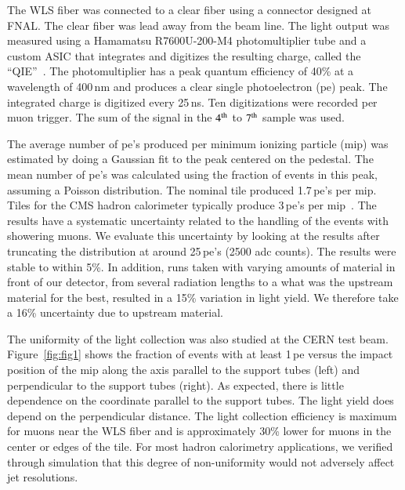 \documentclass[review]{elsarticle}
\begin{document}
The WLS fiber was connected to a clear fiber using a
connector designed at FNAL. The clear fiber was lead away from the
beam line. The light output was measured using a Hamamatsu
R7600U-200-M4 photomultiplier tube and a custom ASIC that integrates
and digitizes the resulting charge, called the ``QIE''~\cite{qie}.
The photomultiplier has a peak quantum efficiency of 40\% at a
wavelength of 400\,nm and produces a clear single photoelectron (pe)
peak. The integrated charge is digitized every 25\,ns. Ten
digitizations were recorded per muon trigger. The sum of the signal
in the ${\rm 4^{th}}$ to ${\rm 7^{th}}$ sample was used.

The average number of pe's produced per minimum ionizing particle
(mip) was estimated by doing a Gaussian fit to the peak centered on
the pedestal. The mean number of pe's was calculated using the
fraction of events in this peak, assuming a Poisson distribution. The
nominal tile produced 1.7\,pe's per mip. Tiles for the CMS hadron
calorimeter typically produce 3\,pe's per mip~\cite{CMSHB}. The results
have a systematic uncertainty related to the handling of the events
with showering muons. We evaluate this uncertainty by looking at the
results after truncating the distribution at around 25\,pe's (2500 adc
counts). The results were stable to within 5\%. In addition, runs
taken with varying amounts of material in front of our detector, from
several radiation lengths to a {\color{red} what was the upstream
 material for the best}, resulted in a 15\% variation in light yield.
We therefore take a 16\% uncertainty due to upstream material.

The uniformity of the light collection was also studied at the CERN
test beam. Figure~\ref{fig:fig1} shows the fraction of events with at
least 1\,pe versus the impact position of the mip along the axis
parallel to the support tubes (left) and perpendicular to the support
tubes (right). As expected, there is little dependence on the
coordinate parallel to the support tubes. The light yield does depend
on the perpendicular distance. The light collection efficiency is
maximum for muons near the WLS fiber and is approximately 30\%
lower for muons in the center or edges of the tile. For most hadron
calorimetry applications, we verified through simulation that this
degree of non-uniformity would not adversely affect jet resolutions.
\end{document}
